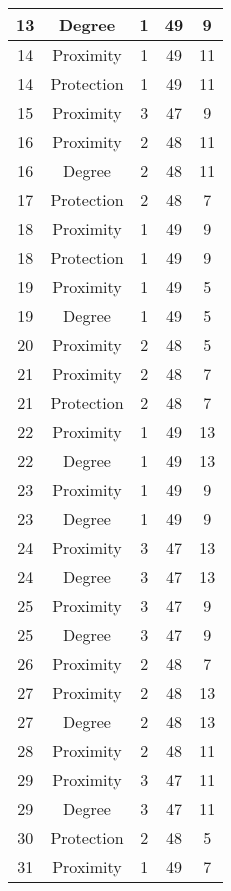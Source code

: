 \documentclass[results.tex]{subfiles}
\begin{document}
\begin{center}
\begin{tabular}{| c || c | c | c | c |}
    \hline
    13 & Degree & 1 & 49 & 9 \\ 
    \hline
    14 & Proximity & 1 & 49 & 11 \\ 
    \hline
    14 & Protection & 1 & 49 & 11 \\ 
    \hline
    15 & Proximity & 3 & 47 & 9 \\ 
    \hline
    16 & Proximity & 2 & 48 & 11 \\ 
    \hline
    16 & Degree & 2 & 48 & 11 \\ 
    \hline
    17 & Protection & 2 & 48 & 7 \\ 
    \hline
    18 & Proximity & 1 & 49 & 9 \\ 
    \hline
    18 & Protection & 1 & 49 & 9 \\ 
    \hline
    19 & Proximity & 1 & 49 & 5 \\ 
    \hline
    19 & Degree & 1 & 49 & 5 \\ 
    \hline
    20 & Proximity & 2 & 48 & 5 \\ 
    \hline
    21 & Proximity & 2 & 48 & 7 \\ 
    \hline
    21 & Protection & 2 & 48 & 7 \\ 
    \hline
    22 & Proximity & 1 & 49 & 13 \\ 
    \hline
    22 & Degree & 1 & 49 & 13 \\ 
    \hline
    23 & Proximity & 1 & 49 & 9 \\ 
    \hline
    23 & Degree & 1 & 49 & 9 \\ 
    \hline
    24 & Proximity & 3 & 47 & 13 \\ 
    \hline
    24 & Degree & 3 & 47 & 13 \\ 
    \hline
    25 & Proximity & 3 & 47 & 9 \\ 
    \hline
    25 & Degree & 3 & 47 & 9 \\ 
    \hline
    26 & Proximity & 2 & 48 & 7 \\ 
    \hline
    27 & Proximity & 2 & 48 & 13 \\ 
    \hline
    27 & Degree & 2 & 48 & 13 \\ 
    \hline
    28 & Proximity & 2 & 48 & 11 \\ 
    \hline
    29 & Proximity & 3 & 47 & 11 \\ 
    \hline
    29 & Degree & 3 & 47 & 11 \\ 
    \hline
    30 & Protection & 2 & 48 & 5 \\ 
    \hline
    31 & Proximity & 1 & 49 & 7 \\ 

\end{tabular}
\end{center}
\end{document}
